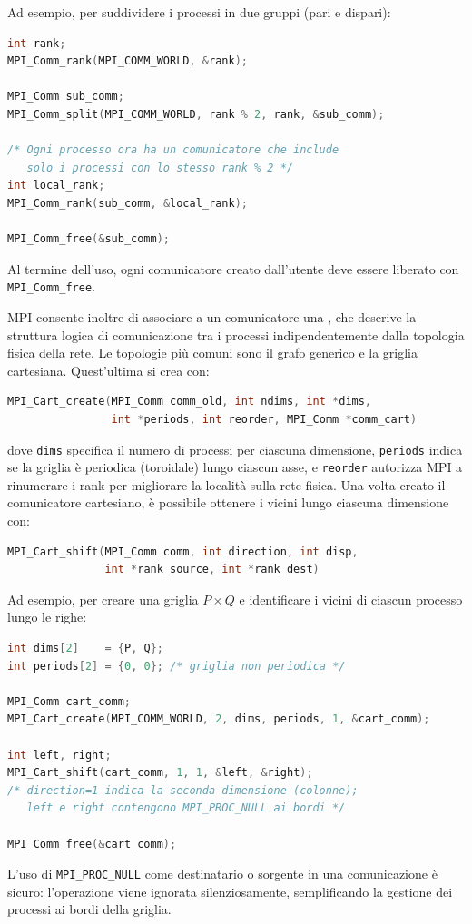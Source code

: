 Ad esempio, per suddividere i processi in due gruppi (pari e dispari):
\begin{lstlisting}[language=C, numbers=none]
int rank;
MPI_Comm_rank(MPI_COMM_WORLD, &rank);

MPI_Comm sub_comm;
MPI_Comm_split(MPI_COMM_WORLD, rank % 2, rank, &sub_comm);

/* Ogni processo ora ha un comunicatore che include
   solo i processi con lo stesso rank % 2 */
int local_rank;
MPI_Comm_rank(sub_comm, &local_rank);

MPI_Comm_free(&sub_comm);
\end{lstlisting}
Al termine dell'uso, ogni comunicatore creato dall'utente deve essere liberato con \texttt{MPI\_Comm\_free}.

MPI consente inoltre di associare a un comunicatore una , che descrive la struttura logica di comunicazione tra i processi indipendentemente dalla topologia fisica della rete. Le topologie più comuni sono il grafo generico e la griglia cartesiana. Quest'ultima si crea con:
\begin{lstlisting}[language=C, numbers=none]
MPI_Cart_create(MPI_Comm comm_old, int ndims, int *dims,
                int *periods, int reorder, MPI_Comm *comm_cart)
\end{lstlisting}
dove \texttt{dims} specifica il numero di processi per ciascuna dimensione, \texttt{periods} indica se la griglia è periodica (toroidale) lungo ciascun asse, e \texttt{reorder} autorizza MPI a rinumerare i rank per migliorare la località sulla rete fisica. Una volta creato il comunicatore cartesiano, è possibile ottenere i vicini lungo ciascuna dimensione con:
\begin{lstlisting}[language=C, numbers=none]
MPI_Cart_shift(MPI_Comm comm, int direction, int disp,
               int *rank_source, int *rank_dest)
\end{lstlisting}

Ad esempio, per creare una griglia $P \times Q$ e identificare i vicini di ciascun processo lungo le righe:
\begin{lstlisting}[language=C, numbers=none]
int dims[2]    = {P, Q};
int periods[2] = {0, 0}; /* griglia non periodica */

MPI_Comm cart_comm;
MPI_Cart_create(MPI_COMM_WORLD, 2, dims, periods, 1, &cart_comm);

int left, right;
MPI_Cart_shift(cart_comm, 1, 1, &left, &right);
/* direction=1 indica la seconda dimensione (colonne);
   left e right contengono MPI_PROC_NULL ai bordi */

MPI_Comm_free(&cart_comm);
\end{lstlisting}
L'uso di \texttt{MPI\_PROC\_NULL} come destinatario o sorgente in una comunicazione è sicuro: l'operazione viene ignorata silenziosamente, semplificando la gestione dei processi ai bordi della griglia.

